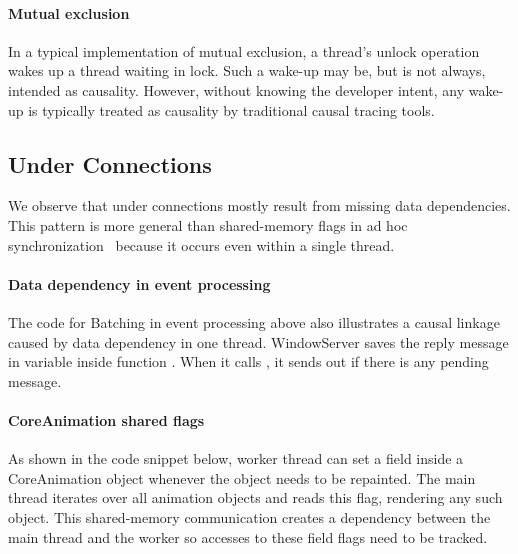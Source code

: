 \paragraph{Mutual exclusion}

In a typical implementation of mutual exclusion, a thread's unlock
operation wakes up a thread waiting in lock.  Such a wake-up may be, but
is not always, intended as causality.  However, without knowing the
developer intent, any wake-up is typically treated as causality by
traditional causal tracing tools.

\subsection{Under Connections}

We observe that under connections mostly result from missing data
dependencies.  This pattern is more general than shared-memory flags in ad
hoc synchronization~\cite{xiong2010ad} because it occurs even within a
single thread.

\paragraph{Data dependency in event processing}
The code for Batching in event processing above also illustrates a causal
linkage caused by data dependency in one thread. WindowServer saves the
reply message in variable  inside function
.  When it calls , it
sends out  if there is any pending message.

\paragraph{CoreAnimation shared flags}
As shown in the code snippet below, worker thread can set
a field  inside a CoreAnimation
object whenever the object needs to be repainted. The main thread iterates over
all animation objects and reads this flag, rendering any such object. This
shared-memory communication creates a dependency between the main thread and the
worker so accesses to these field flags need to be tracked.

